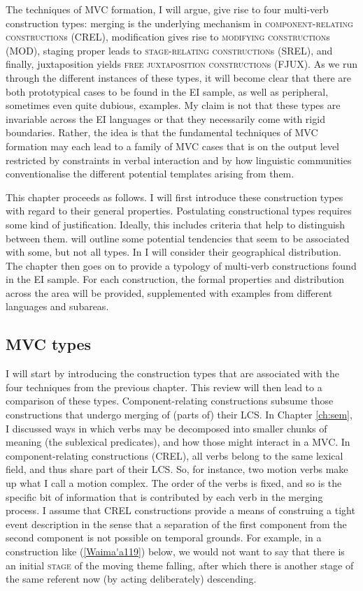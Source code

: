 \largerpage[-1]
The techniques of MVC formation, I will argue, give rise to four multi-verb construction types: merging is the underlying mechanism in \textsc{component-relating construction}s (CREL), modification gives rise to \textsc{modifying construction}s (MOD), staging proper leads to \textsc{stage-relating construction}s (SREL), and finally, juxtaposition yields \textsc{free juxtaposition construction}s (FJUX). As we run through the different instances of these types, it will become clear that there are both prototypical cases to be found in the EI sample, as well as peripheral, sometimes even quite dubious, examples. My claim is not that these types are invariable across the EI languages or that they necessarily come with rigid boundaries. Rather, the idea is that the fundamental techniques of MVC formation may each lead to a family of MVC cases that is on the output level restricted by constraints in verbal interaction and by how linguistic communities conventionalise the different potential templates arising from them. 

This chapter proceeds as follows. I will first introduce these construction types with regard to their general properties. Postulating constructional types requires some kind of justification. Ideally, this includes criteria that help to distinguish between them.  will outline some potential tendencies that seem to be associated with some, but not all types. In  I will consider their geographical distribution. The chapter then goes on to provide a typology of multi-verb constructions found in the EI sample. For each construction, the formal properties and distribution across the area will be provided, supplemented with examples from different languages and subareas. 

\subsection{MVC types} \label{sec:mvc-types}

I will start by introducing the construction types that are associated with the four techniques from the previous chapter. This review will then lead to a comparison of these types. Component-relating constructions subsume those constructions that undergo merging of (parts of) their LCS. In Chapter \ref{ch:sem}, I  discussed ways in which verbs may be decomposed into smaller chunks of meaning (the sublexical predicates), and how those might interact in a MVC. In component-relating constructions (CREL), all verbs belong to the same lexical field, and thus share part of their LCS. So, for instance, two motion verbs make up what I call a motion complex. The order of the verbs is fixed, and so is the specific bit of information that is contributed by each verb in the merging process. I assume that CREL constructions provide a means of construing a tight event description in the sense that a separation of the first component from the second component is not possible on temporal grounds. For example, in a construction like (\ref{Waima'a119}) below, we would not want to say that there is an initial \textsc{stage} of the moving theme falling, after which there is another stage of the same referent now (by acting deliberately) descending. 

